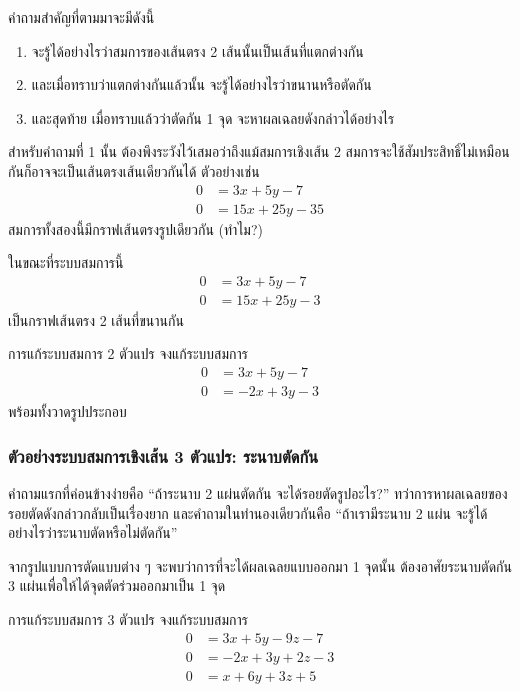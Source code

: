 คำถามสำคัญที่ตามมาจะมีดังนี้
\begin{enumerate}
    \item จะรู้ได้อย่างไรว่าสมการของเส้นตรง 2 เส้นนั้นเป็นเส้นที่แตกต่างกัน
    \item และเมื่อทราบว่าแตกต่างกันแล้วนั้น จะรู้ได้อย่างไรว่าขนานหรือตัดกัน
    \item และสุดท้าย เมื่อทราบแล้วว่าตัดกัน 1 จุด จะหาผลเฉลยดังกล่าวได้อย่างไร
\end{enumerate}

สำหรับคำถามที่ 1 นั้น ต้องพึงระวังไว้เสมอว่าถึงแม้สมการเชิงเส้น 2 สมการจะใช้สัมประสิทธิ์ไม่เหมือนกันก็อาจจะเป็นเส้นตรงเส้นเดียวกันได้ ตัวอย่างเช่น
\begin{align*}
    0 &= 3x + 5y - 7\\
    0 &= 15x + 25y - 35
\end{align*}
สมการทั้งสองนี้มีกราฟเส้นตรงรูปเดียวกัน (ทำไม?)

ในขณะที่ระบบสมการนี้
\begin{align*}
    0 &= 3x + 5y - 7\\
    0 &= 15x + 25y - 3
\end{align*}
เป็นกราฟเส้นตรง 2 เส้นที่ขนานกัน

\begin{example}{การแก้ระบบสมการ 2 ตัวแปร}{}
    จงแก้ระบบสมการ
    \begin{align*}
        0 &= 3x + 5y - 7\\
        0 &= -2x + 3y - 3
    \end{align*}
    พร้อมทั้งวาดรูปประกอบ
\end{example}
\newpage
\subsubsection{ตัวอย่างระบบสมการเชิงเส้น 3 ตัวแปร: ระนาบตัดกัน}
คำถามแรกที่ค่อนข้างง่ายคือ ``ถ้าระนาบ 2 แผ่นตัดกัน จะได้รอยตัดรูปอะไร?'' ทว่าการหาผลเฉลยของรอยตัดดังกล่าวกลับเป็นเรื่องยาก
และคำถามในทำนองเดียวกันคือ ``ถ้าเรามีระนาบ 2 แผ่น จะรู้ได้อย่างไรว่าระนาบตัดหรือไม่ตัดกัน''
~\vspace{5cm}

จากรูปแบบการตัดแบบต่าง ๆ จะพบว่าการที่จะได้ผลเฉลยแบบออกมา 1 จุดนั้น ต้องอาศัยระนาบตัดกัน 3 แผ่นเพื่อให้ได้จุดตัดร่วมออกมาเป็น 1 จุด
\begin{example}{การแก้ระบบสมการ 3 ตัวแปร}{}
    จงแก้ระบบสมการ
    \begin{align*}
        0 &= 3x + 5y - 9z - 7\\
        0 &= -2x + 3y + 2z - 3\\
        0 &= x + 6y + 3z +5
    \end{align*}
\end{example}
\newpage
